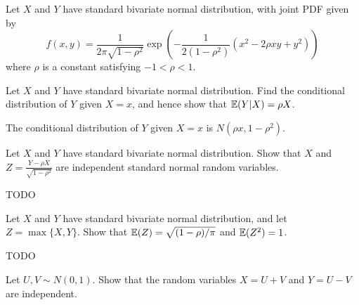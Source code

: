 \begin{exercise}
\begin{questions}
\question
Let $X$ and $Y$ have standard bivariate normal distribution, with joint PDF given by
\[
f(x,y) = \frac{1}{2\pi\sqrt{1-\rho^2}}\exp\left(-\frac{1}{2(1-\rho^2)}(x^2 - 2\rho xy + y^2)\right)
\]
where $\rho$ is a constant satisfying $-1 < \rho < 1$. 
\question
Let $X$ and $Y$ have standard bivariate normal distribution. Find the conditional distribution of $Y$ given $X=x$, and hence show that $\mathbb{E}(Y|X) = \rho X$.
\begin{answer}
The conditional distribution of $Y$ given $X=x$ is $N(\rho x, 1-\rho^2)$.
\end{answer}
\question
Let $X$ and $Y$ have standard bivariate normal distribution. Show that $X$ and $\displaystyle Z=\frac{Y-\rho X}{\sqrt{1-\rho^2}}$ are independent standard normal random variables.
\begin{answer}
TODO
\end{answer}
\question
Let $X$ and $Y$ have standard bivariate normal distribution, and let $Z=\max\{X,Y\}$. Show that $\mathbb{E}(Z)=\sqrt{(1-\rho)/\pi}$ and $\mathbb{E}(Z^2)=1$.
\begin{answer}
TODO
\end{answer}
\question
Let $U,V\sim N(0,1)$. Show that the random variables $X = U+V$ and $Y = U-V$ are independent.


\end{questions}
\end{exercise}
